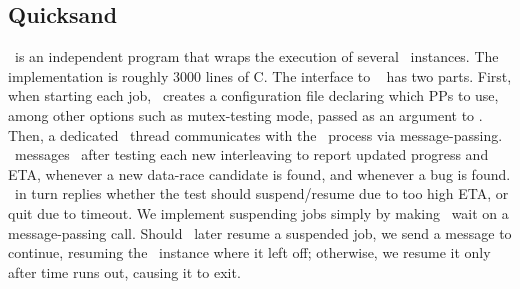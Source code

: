 \subsection{Quicksand}

\quicksand~is an independent program that wraps the execution of several \landslide~instances.
The implementation is roughly 3000 lines of C.
The interface to \landslide~ has two parts. %
First, when starting each job, \quicksand~creates a configuration file declaring which PPs to use,
among other options such as mutex-testing mode,
passed as an argument to \landslide.
Then, a dedicated \quicksand~thread communicates with the \landslide~process via message-passing. %
\landslide~messages \quicksand~after testing each new interleaving to report updated progress and ETA,
whenever a new data-race candidate is found, and whenever a bug is found.
\quicksand~in turn replies whether the test should suspend/resume due to too high ETA, or quit due to timeout.
We implement suspending jobs simply by making \landslide~wait on a message-passing call.
Should \quicksand~later resume a suspended job, we send a message to continue,
resuming the \landslide~instance where it left off;
otherwise, we resume it only after time runs out, causing it to exit.


